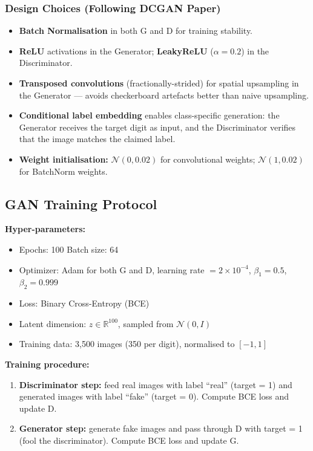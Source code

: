 \documentclass[12pt, a4paper]{article}
\begin{document}
\subsubsection{Design Choices (Following DCGAN Paper)}

\begin{itemize}
    \item \textbf{Batch Normalisation} in both G and D for training stability.
    \item \textbf{ReLU} activations in the Generator; \textbf{LeakyReLU} ($\alpha=0.2$)
          in the Discriminator.
    \item \textbf{Transposed convolutions} (fractionally-strided) for spatial upsampling
          in the Generator --- avoids checkerboard artefacts better than naive upsampling.
    \item \textbf{Conditional label embedding} enables class-specific generation: the
          Generator receives the target digit as input, and the Discriminator verifies
          that the image matches the claimed label.
    \item \textbf{Weight initialisation:} $\mathcal{N}(0, 0.02)$ for convolutional
          weights; $\mathcal{N}(1, 0.02)$ for BatchNorm weights.
\end{itemize}

\subsection{GAN Training Protocol}

\textbf{Hyper-parameters:}
\begin{itemize}
    \item Epochs: 100 \quad Batch size: 64
    \item Optimizer: Adam for both G and D, learning rate $= 2 \times 10^{-4}$,
          $\beta_1 = 0.5$, $\beta_2 = 0.999$
    \item Loss: Binary Cross-Entropy (BCE)
    \item Latent dimension: $z \in \mathbb{R}^{100}$, sampled from $\mathcal{N}(0, I)$
    \item Training data: 3{,}500 images (350 per digit), normalised to $[-1, 1]$
\end{itemize}

\textbf{Training procedure:}
\begin{enumerate}
    \item \textbf{Discriminator step:} feed real images with label ``real'' (target = 1)
          and generated images with label ``fake'' (target = 0). Compute BCE loss and
          update D.
    \item \textbf{Generator step:} generate fake images and pass through D with target
          = 1 (fool the discriminator). Compute BCE loss and update G.
\end{enumerate}
\end{document}
